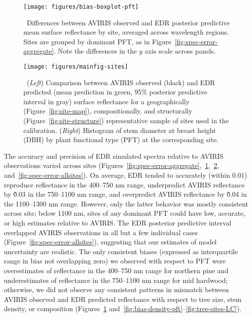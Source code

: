 \begin{figure}
  \centering
  \texttt{[image: figures/bias-boxplot-pft]}
  \caption{\label{fig:bias-boxplot-pft}\
    Differences between AVIRIS observed and EDR posterior predictive mean surface reflectance by site, averaged across wavelength regions.
    Sites are grouped by dominant PFT, as in Figure~\ref{fig:spec-error-aggregate}.
    Note the differences in the $y$ axis scale across panels.
  }
\end{figure}

\begin{figure}
  \centering
  \texttt{[image: figures/mainfig-sites]}
  \caption{\label{fig:spec-error-all}\
    (\emph{Left}) Comparison between AVIRIS observed (black) and
    EDR predicted (mean prediction in green, 95\% posterior predictive interval in gray)
    surface reflectance for a geographically (Figure~\ref{fig:site-map}), compositionally, and structurally (Figure~\ref{fig:site-structure}) representative sample of sites used in the calibration.
    (\emph{Right}) Histogram of stem diameter at breast height (DBH) by plant functional type (PFT) at the corresponding site.
  }
\end{figure}

The accuracy and precision of EDR simulated spectra relative to AVIRIS observations varied across sites (Figures~\ref{fig:spec-error-aggregate},~\ref{fig:bias-boxplot-pft},~\ref{fig:spec-error-all}, and~\ref{fig:spec-error-allsites}).
On average, EDR tended to accurately (within 0.01) reproduce reflectance in the 400--750 \unit{nm} range, underpredict AVIRIS reflectance by \~0.03 in the 750--1100 \unit{nm} range, and overpredict AVIRIS reflectance by \~0.04 in the 1100--1300 \unit{nm} range.
However, only the latter behavior was mostly consistent across site; below 1100 \unit{nm}, sites of any dominant PFT could have low, accurate, or high estimates relative to AVIRIS.\@
The EDR posterior predictive interval overlapped AVIRIS observations in all but a few individual cases (Figure~\ref{fig:spec-error-allsites}), suggesting that our estimates of model uncertainty are realistic.
The only consistent biases (expressed as interquartile range in bias not overlapping zero) we observed with respect to PFT were overestimates of reflectance in the 400--750 \unit{nm} range for northern pine and underestimates of reflectance in the 750--1100 \unit{nm} range for mid hardwood;
otherwise, we did not observe any consistent patterns in mismatch between AVIRIS observed and EDR predicted reflectance with respect to tree size, stem density, or composition (Figures~\ref{fig:bias-boxplot-pft} and~\ref{fig:bias-density-pft}--\ref{fig:tree-sites-LC}).

